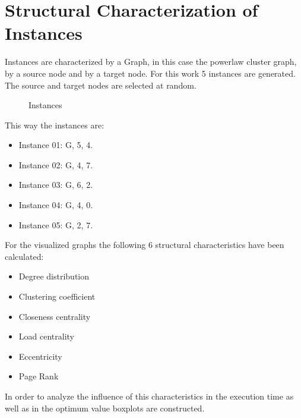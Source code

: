 \documentclass[10pt,a4paper,openany]{article}
\begin{document}
		
	
	\section*{Structural Characterization of Instances}
	
	Instances are characterized by a Graph, in this case the powerlaw cluster graph, by a source node and by a target node. For this work 5 instances are generated. The source and target nodes are selected at random.
	\begin{figure}[H]
		\centering
		
		\caption{Instances} \label{fig:instances}
	\end{figure}

	\newpage

	This way the instances are:
	
	\begin{itemize}
		\item Instance 01: G, 5, 4.
		\item Instance 02: G, 4, 7.
		\item Instance 03: G, 6, 2.
		\item Instance 04: G, 4, 0.
		\item Instance 05: G, 2, 7.	
	\end{itemize}

For the visualized graphs the following 6 structural characteristics have been calculated:

\begin{itemize}
	\item Degree distribution
	\item Clustering coefficient
	\item Closeness centrality
	\item Load centrality
	\item Eccentricity
	\item Page Rank		
\end{itemize}

	In order to analyze the influence of this characteristics in the execution time as well as in the optimum value boxplots are constructed.
	
\end{document}
